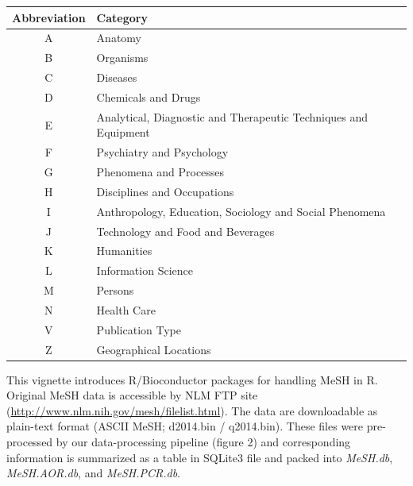 \documentclass[11pt]{article}
\newcommand{\Rpackage}[1]{{\textit{#1}}}
\begin{document}
\begin{center}
  \begin{table}[htbp]
    \begin{tabular}{|c|l|}\hline
      Abbreviation & Category \\ \hline \hline
      A & Anatomy \\ \hline
      B & Organisms \\ \hline
      C & Diseases \\ \hline
      D & Chemicals and Drugs \\ \hline
      E & Analytical, Diagnostic and Therapeutic Techniques and Equipment \\ \hline
      F & Psychiatry and Psychology \\ \hline
      G & Phenomena and Processes \\ \hline
      H & Disciplines and Occupations \\ \hline
      I & Anthropology, Education, Sociology and Social Phenomena \\ \hline
      J & Technology and Food and Beverages \\ \hline
      K & Humanities \\ \hline
      L & Information Science \\ \hline
      M & Persons \\ \hline
      N & Health Care \\ \hline
      V & Publication Type \\ \hline
      Z & Geographical Locations \\ \hline
\end{tabular}
  \end{table}
\end{center}
This vignette introduces R/Bioconductor packages for handling MeSH in R. Original MeSH data is accessible by NLM FTP site (\url{http://www.nlm.nih.gov/mesh/filelist.html}). The data are downloadable as plain-text format (ASCII MeSH; d2014.bin / q2014.bin). These files were pre-processed by our data-processing pipeline (figure 2) and corresponding information is summarized as a table in SQLite3 file and packed into \Rpackage{MeSH.db}, \Rpackage{MeSH.AOR.db}, and \Rpackage{MeSH.PCR.db}.

\clearpage
\end{document}
